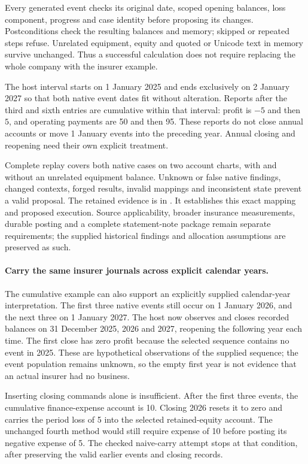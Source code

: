 Every generated event checks its original date, scoped opening balances,
loss component, progress and case identity before proposing its changes.
Postconditions check the resulting balances and memory; skipped or repeated
steps refuse. Unrelated equipment, equity and quoted or Unicode text in memory
survive unchanged. Thus a successful calculation does not require replacing
the whole company with the insurer example.

The host interval starts on 1 January 2025 and ends exclusively on
2 January 2027 so that both native event dates fit without alteration. Reports
after the third and sixth entries are cumulative within that interval: profit
is $-5$ and then $5$, and operating payments are 50 and then 95. These reports
do not close annual accounts or move 1 January events into the preceding year.
Annual closing and reopening need their own explicit treatment.

Complete replay covers both native cases on two account charts, with and
without an unrelated equipment balance. Unknown or false native findings,
changed contexts, forged results, invalid mappings and inconsistent state
prevent a valid proposal. The retained evidence is in
.
It establishes this exact mapping and proposed execution. Source applicability,
broader insurance measurements, durable posting and a complete statement-note
package remain separate requirements; the supplied historical findings and
allocation assumptions are preserved as such.


\paragraph{Carry the same insurer journals across explicit calendar years.}
The cumulative example can also support an explicitly supplied calendar-year
interpretation. The first three native events still occur on 1 January 2026,
and the next three on 1 January 2027. The host now observes and closes recorded
balances on 31 December 2025, 2026 and 2027, reopening the following year each
time. The first close has zero profit because the selected sequence contains
no event in 2025. These are hypothetical observations of the supplied sequence;
the event population remains unknown, so the empty first year is not evidence
that an actual insurer had no business.

Inserting closing commands alone is insufficient. After the first three
events, the cumulative finance-expense account is 10. Closing 2026 resets it
to zero and carries the period loss of 5 into the selected retained-equity
account. The unchanged fourth method would still require expense of 10 before
posting its negative expense of 5. The checked naive-carry attempt stops at
that condition, after preserving the valid earlier events and closing records.

